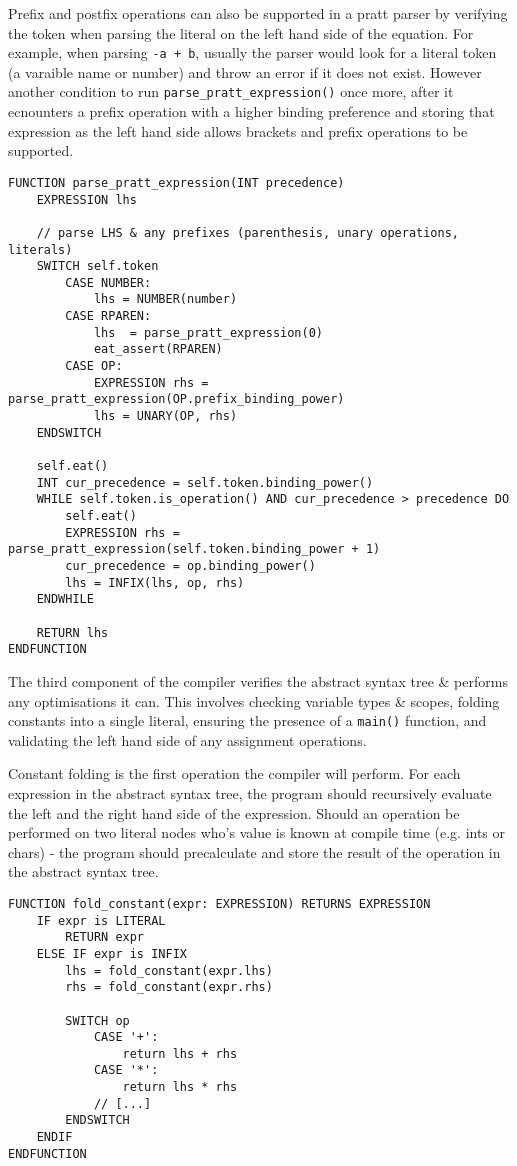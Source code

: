 Prefix and postfix operations can also be supported in a pratt parser by verifying the token when parsing the literal on the left hand side of the equation. For example, when parsing \texttt{-a + b}, usually the parser would look for a literal token (a varaible name or number) and throw an error if it does not exist. However another condition to run \texttt{parse\_pratt\_expression()} once more, after it ecnounters a prefix operation with a higher binding preference and storing that expression as the left hand side allows brackets and prefix operations to be supported.

\begin{lstlisting}
FUNCTION parse_pratt_expression(INT precedence)
    EXPRESSION lhs

    // parse LHS & any prefixes (parenthesis, unary operations, literals)
    SWITCH self.token 
        CASE NUMBER:
            lhs = NUMBER(number)
        CASE RPAREN:
            lhs  = parse_pratt_expression(0)
            eat_assert(RPAREN)
        CASE OP:
            EXPRESSION rhs = parse_pratt_expression(OP.prefix_binding_power)
            lhs = UNARY(OP, rhs)
    ENDSWITCH

    self.eat()
    INT cur_precedence = self.token.binding_power()
    WHILE self.token.is_operation() AND cur_precedence > precedence DO 
        self.eat()
        EXPRESSION rhs = parse_pratt_expression(self.token.binding_power + 1)
        cur_precedence = op.binding_power()
        lhs = INFIX(lhs, op, rhs)
    ENDWHILE

    RETURN lhs
ENDFUNCTION
\end{lstlisting}

The third component of the compiler verifies the abstract syntax tree \& performs any optimisations it can. This involves checking variable types \& scopes, folding constants into a single literal, ensuring the presence of a \texttt{main()} function, and validating the left hand side of any assignment operations. 

Constant folding is the first operation the compiler will perform. For each expression in the abstract syntax tree, the program should recursively evaluate the left and the right hand side of the expression. Should an operation be performed on two literal nodes who's value is known at compile time (e.g. ints or chars) - the program should precalculate and store the result of the operation in the abstract syntax tree. 

\begin{lstlisting}
FUNCTION fold_constant(expr: EXPRESSION) RETURNS EXPRESSION
    IF expr is LITERAL 
        RETURN expr
    ELSE IF expr is INFIX 
        lhs = fold_constant(expr.lhs)
        rhs = fold_constant(expr.rhs)

        SWITCH op 
            CASE '+':
                return lhs + rhs
            CASE '*':
                return lhs * rhs
            // [...]
        ENDSWITCH 
    ENDIF
ENDFUNCTION
\end{lstlisting}

